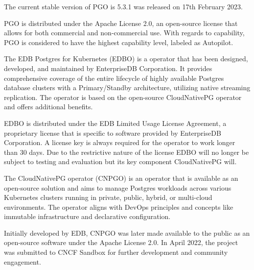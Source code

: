 The current stable version of PGO is 5.3.1 was released on 17th February 2023. \cite{CrunchyV531releaseNotes}

PGO is distributed under the Apache License 2.0, an open-source license that allows for both commercial and non-commercial use. With regards to capability, PGO is considered to have the highest capability level, labeled as Autopilot. \cite{operatorHubCrunchy}

The EDB Postgres for Kubernetes (EDBO) is a operator that has been designed, developed, and maintained by EnterpriseDB Corporation.
It provides comprehensive coverage of the entire lifecycle of highly available Postgres database clusters with a Primary/Standby architecture,
utilizing native streaming replication. The operator is based on the open-source CloudNativePG operator and offers additional benefits. \cite{operatorHubEDB}

EDBO is distributed under the EDB Limited Usage License Agreement, a proprietary license that is specific to software provided by EnterpriseDB Corporation. A license key is always required for the operator to work longer than 30 days. \cite{EDBdocuLicence} Due to the restrictive nature of the license EDBO will no longer be subject to testing and evaluation but its key component CloudNativePG will.

The CloudNativePG operator (CNPGO) is an operator that is available as an open-source solution and aims to manage Postgres workloads across various Kubernetes clusters running in private, public, hybrid, or multi-cloud environments. The operator aligns with DevOps principles and concepts like immutable infrastructure and declarative configuration. \cite{CNPGdocu}

Initially developed by EDB, CNPGO was later made available to the public as an open-source software under the Apache License 2.0. In April 2022, the project was submitted to CNCF Sandbox for further development and community engagement. \cite{CNPGdocu}

